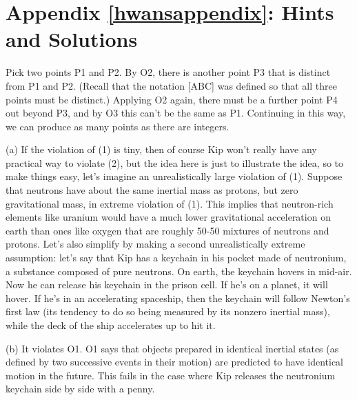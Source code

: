 \label{hwansappendix}%
\appendix\chapter{Appendix \ref{hwansappendix}: Hints and Solutions}
	




Pick two points P1 and P2. By O2, there is another point P3 that is distinct
from P1 and P2. (Recall that the notation [ABC] was defined so that all three
points must be distinct.) Applying O2 again, there must be a further point
P4 out beyond P3, and by O3 this can't be the same as P1. Continuing in this
way, we can produce as many points as there are integers.


(a) If the violation of (1) is tiny, then of course Kip won't really have any
practical way to violate (2), but the idea here is just to illustrate the
idea, so to make things easy, let's imagine an unrealistically large violation
of (1). Suppose that neutrons have about the same inertial mass as protons, but
zero gravitational mass, in extreme violation of (1). This implies that neutron-rich
elements like uranium would have a much lower gravitational acceleration on earth
than ones like oxygen that are roughly 50-50 mixtures of neutrons and protons.
Let's also simplify by making a second unrealistically extreme assumption: let's
say  that Kip has a keychain in his pocket made of neutronium, a substance composed of
pure neutrons. On earth, the keychain hovers in mid-air. Now he can release
his keychain in the prison cell. If he's on a planet, it will hover.
If he's in an accelerating spaceship, then the keychain will follow Newton's
first law (its tendency to do so being measured by its nonzero inertial mass),
while the deck of the ship accelerates up to hit it.

(b) It violates O1. O1 says that objects prepared in identical inertial states
(as defined by two successive events in their motion) are predicted to have
identical motion in the future. This fails in the case where Kip releases the
neutronium keychain side by side with a penny.

